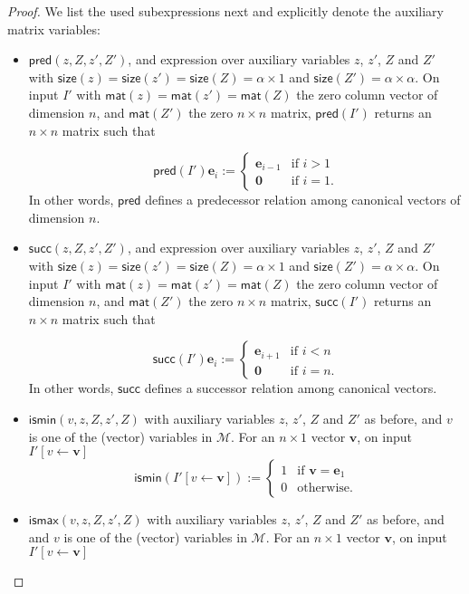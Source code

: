 \begin{proof}
We list the used subexpressions next and explicitly denote the auxiliary matrix variables:
\begin{itemize}
	\item $\mathsf{pred}(z,Z,z',Z')$, and expression over auxiliary variables $z$, $z'$, $Z$ and $Z'$ with $\mathsf{size}(z)=\mathsf{size}(z')=\mathsf{size}(Z)=\alpha\times 1$ and $\mathsf{size}(Z')=\alpha\times\alpha$. On input $I'$ with 
	$\mathsf{mat}(z)=\mathsf{mat}(z')=\mathsf{mat}(Z)$ the zero column vector of dimension $n$, and $\mathsf{mat}(Z')$ the zero $n\times n$ matrix,
	 $\mathsf{pred}(I')$ returns an $n\times n$ matrix such that 
	 
	 $$\mathsf{pred}(I')\mathbf{e}_i:=\begin{cases} 
	 \mathbf{e}_{i-1} & \text{if $i>1$}\\
	 \mathbf{0} & \text{if $i=1$}.
	\end{cases}
	$$
	In other words, $\mathsf{pred}$ defines a predecessor relation among canonical vectors of dimension $n$.
	 \item $\mathsf{succ}(z,Z,z',Z')$, and expression over auxiliary variables $z$, $z'$, $Z$ and $Z'$ with $\mathsf{size}(z)=\mathsf{size}(z')=\mathsf{size}(Z)=\alpha\times 1$ and $\mathsf{size}(Z')=\alpha\times\alpha$. On input $I'$ with 
	$\mathsf{mat}(z)=\mathsf{mat}(z')=\mathsf{mat}(Z)$ the zero column vector of dimension $n$, and $\mathsf{mat}(Z')$ the zero $n\times n$ matrix,
	 $\mathsf{succ}(I')$ returns an $n\times n$ matrix such that 
	 
	 $$\mathsf{succ}(I')\mathbf{e}_i:=\begin{cases} 
	 \mathbf{e}_{i+1} & \text{if $i<n$}\\
	 \mathbf{0} & \text{if $i=n$}.
	\end{cases}
	$$
	In other words, $\mathsf{succ}$ defines a successor relation among canonical vectors.
	\item $\textsf{ismin}(v,z,Z,z',Z)$ with auxiliary variables $z$, $z'$, $Z$ and $Z'$ as before, and $v$ is one of the (vector) variables in $\mathcal{M}$. For an $n\times 1$ vector $\mathbf{v}$, on input $I'[v\gets \mathbf{v}]$	$$\mathsf{ismin}(I'[v\gets\mathbf{v}]):=\begin{cases} 1 & \text{if $\mathbf{v}=\mathbf{e}_1$}\\
		0 & \text{otherwise}.
		\end{cases}$$
	\item $\textsf{ismax}(v,z,Z,z',Z)$ with auxiliary variables $z$, $z'$, $Z$ and $Z'$ as before, and 
	and $v$ is one of the (vector) variables in $\mathcal{M}$. For an $n\times 1$ vector $\mathbf{v}$, on input $I'[v\gets \mathbf{v}]$
	

\end{itemize}
\end{proof}
